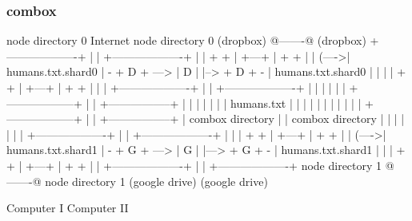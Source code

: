 \begin{frame}[fragile]
  \frametitle{combox}

  {\tiny
  \begin{semiverbatim}

         node directory 0                Internet              node directory 0
         (dropbox)                       @-------@             (dropbox)
        +-------------------+            |       |            +-------------------+
        |                   |    + +     | +---+ |     + +    |                   |
  (---->| humans.txt.shard0 | - + D + ---> | D | |--> + D + - | humans.txt.shard0 |
  |     |                   |    + +     | +---+ |     + +    |                   |
  |     +-------------------+            |       |            +-------------------+
  |                                      |       |
  |                                      |       |
 +------------------+                    |       |                        +-----------------+
 |                  |                    |       |                        |                 |
 |  humans.txt      |                    |       |                        |                 |
 |                  |                    |       |                        |                 |
 +------------------+                    |       |                        +-----------------+
  |  combox directory                    |       |                      combox directory
  |                                      |       |
  |                                      |       |
  |     +-------------------+            |       |             +-------------------+
  |     |                   |    + +     | +---+ |      + +    |                   |
  (---->| humans.txt.shard1 | - + G + ---> | G | |---> + G + - | humans.txt.shard1 |
        |                   |    + +     | +---+ |      + +    |                   |
        +-------------------+            |       |             +-------------------+
         node directory 1                @-------@              node directory 1
         (google drive)                                         (google drive)

  Computer I                                                                    Computer II
  \end{semiverbatim}
  }

\end{frame}



